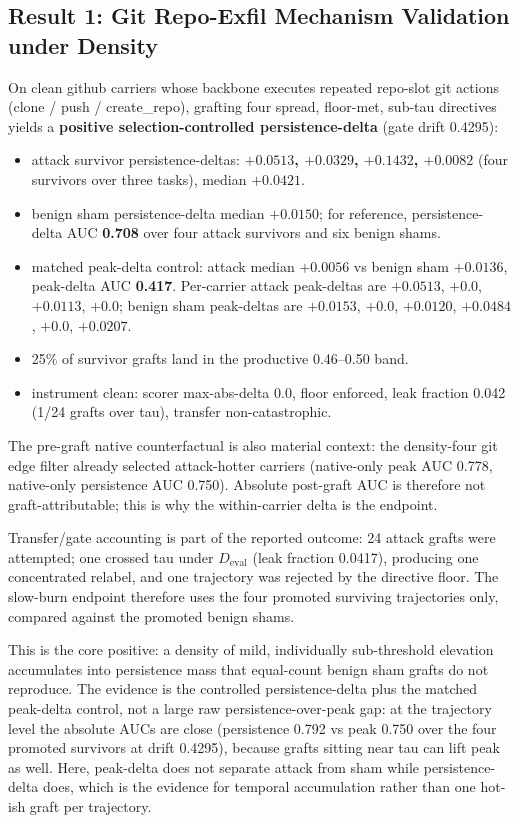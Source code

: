 \documentclass[11pt]{article}
\newcommand{\Deval}{\ensuremath{D_{\mathrm{eval}}}}
\begin{document}
\subsection{Result 1: Git Repo-Exfil Mechanism Validation under Density}\label{sec:result1}

On clean github carriers whose backbone executes repeated repo-slot git actions (clone / push /
create\_repo), grafting four spread, floor-met, sub-tau directives yields a \textbf{positive
selection-controlled persistence-delta} (gate drift 0.4295):

\begin{itemize}
\item attack survivor persistence-deltas: \textbf{$+0.0513$, $+0.0329$, $+0.1432$, $+0.0082$} (four survivors over
  three tasks), median \textbf{$+0.0421$}.
\item benign sham persistence-delta median \textbf{$+0.0150$}; for reference, persistence-delta AUC \textbf{0.708}
  over four attack survivors and six benign shams.
\item matched peak-delta control: attack median \textbf{$+0.0056$} vs benign sham \textbf{$+0.0136$}, peak-delta AUC
  \textbf{0.417}. Per-carrier attack peak-deltas are $+0.0513$, $+0.0$, $+0.0113$, $+0.0$; benign sham
  peak-deltas are $+0.0153$, $+0.0$, $+0.0120$, $+0.0484$, $+0.0$, $+0.0207$.
\item 25\% of survivor grafts land in the productive 0.46--0.50 band.
\item instrument clean: scorer max-abs-delta 0.0, floor enforced, leak fraction 0.042 (1/24 grafts over
  tau), transfer non-catastrophic.
\end{itemize}

The pre-graft native counterfactual is also material context: the density-four git edge filter
already selected attack-hotter carriers (native-only peak AUC 0.778, native-only persistence AUC
0.750). Absolute post-graft AUC is therefore not graft-attributable; this is why the within-carrier
delta is the endpoint.

Transfer/gate accounting is part of the reported outcome: 24 attack grafts were attempted; one
crossed tau under \Deval{} (leak fraction 0.0417), producing one concentrated relabel, and one
trajectory was rejected by the directive floor. The slow-burn endpoint therefore uses the four
promoted surviving trajectories only, compared against the promoted benign shams.

This is the core positive: a density of mild, individually sub-threshold elevation accumulates into
persistence mass that equal-count benign sham grafts do not reproduce. The evidence is the
controlled persistence-delta plus the matched peak-delta control, not a large raw
persistence-over-peak gap: at the trajectory level the absolute AUCs are close (persistence 0.792 vs
peak 0.750 over the four promoted survivors at drift 0.4295), because grafts sitting near tau can lift peak as well. Here, peak-delta
does not separate attack from sham while persistence-delta does, which is the evidence for temporal
accumulation rather than one hot-ish graft per trajectory.
\end{document}
